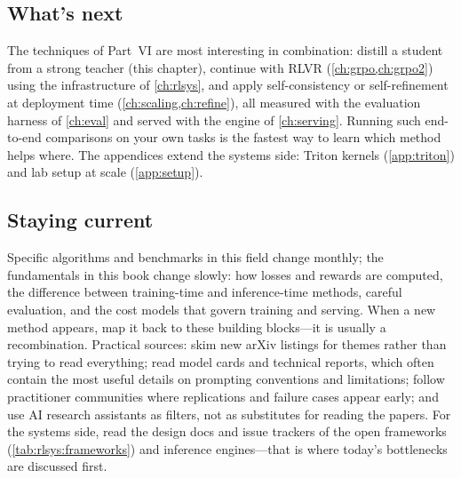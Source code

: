 \subsection{What's next}

The techniques of Part~VI are most interesting in combination: distill a student from a strong
teacher (this chapter), continue with RLVR (\cref{ch:grpo,ch:grpo2}) using the infrastructure of
\cref{ch:rlsys}, and apply self-consistency or self-refinement at deployment time
(\cref{ch:scaling,ch:refine}), all measured with the evaluation harness of \cref{ch:eval} and served
with the engine of \cref{ch:serving}. Running such end-to-end comparisons on your own tasks is
the fastest way to learn which method helps where. The appendices extend the systems side:
Triton kernels (\cref{app:triton}) and lab setup at scale (\cref{app:setup}).

\subsection{Staying current}

Specific algorithms and benchmarks in this field change monthly; the fundamentals in this book
change slowly: how losses and rewards are computed, the difference between training-time and
inference-time methods, careful evaluation, and the cost models that govern training and
serving. When a new method appears, map it back to these building blocks---it is usually a
recombination. Practical sources: skim new arXiv listings for themes rather than trying to read
everything; read model cards and technical reports, which often contain the most useful details
on prompting conventions and limitations; follow practitioner communities where replications and
failure cases appear early; and use AI research assistants as filters, not as substitutes for
reading the papers. For the systems side, read the design docs and issue trackers of the open
frameworks (\cref{tab:rlsys:frameworks}) and inference engines---that is where today's
bottlenecks are discussed first.

